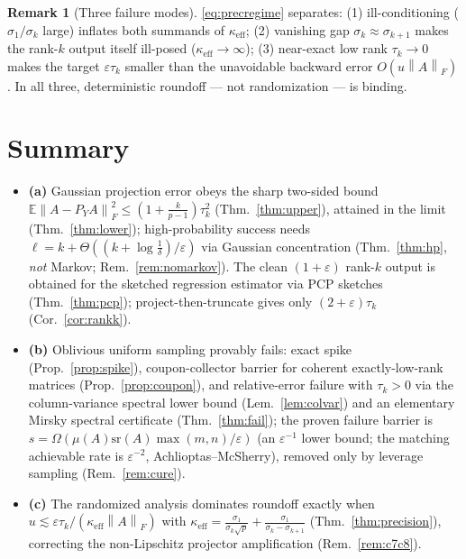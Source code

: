 \documentclass{amsart}
\theoremstyle{definition}
\newtheorem{remark}{Remark}
\newcommand{\Frob}[1]{\left\lVert #1\right\rVert_F}
\newcommand{\E}{\mathbb{E}}
\begin{document}
\begin{remark}[Three failure modes]
\eqref{eq:precregime} separates: (1) ill-conditioning ($\sigma_1/\sigma_k$
large) inflates both summands of $\kappa_{\mathrm{eff}}$; (2) vanishing gap
$\sigma_k\approx\sigma_{k+1}$ makes the rank-$k$ output itself ill-posed
($\kappa_{\mathrm{eff}}\to\infty$); (3) near-exact low rank $\tau_k\to0$ makes
the target $\varepsilon\tau_k$ smaller than the unavoidable backward error
$O(u\Frob A)$. In all three, deterministic roundoff --- not randomization --- is
binding.
\end{remark}

\section{Summary}

\begin{itemize}
\item \textbf{(a)} Gaussian projection error obeys the sharp two-sided bound
$\E\Frob{A-P_YA}^2\le(1+\tfrac k{p-1})\tau_k^2$ (Thm.~\ref{thm:upper}), attained
in the limit (Thm.~\ref{thm:lower}); high-probability success needs
$\ell=k+\Theta((k+\log\tfrac1\delta)/\varepsilon)$ via Gaussian concentration
(Thm.~\ref{thm:hp}, \emph{not} Markov; Rem.~\ref{rem:nomarkov}). The clean
$(1+\varepsilon)$ rank-$k$ output is obtained for the sketched regression
estimator via PCP sketches (Thm.~\ref{thm:pcp}); project-then-truncate gives only
$(2+\varepsilon)\tau_k$ (Cor.~\ref{cor:rankk}).
\item \textbf{(b)} Oblivious uniform sampling provably fails: exact spike
(Prop.~\ref{prop:spike}), coupon-collector barrier for coherent exactly-low-rank
matrices (Prop.~\ref{prop:coupon}), and relative-error failure with $\tau_k>0$
via the column-variance spectral lower bound (Lem.~\ref{lem:colvar}) and an
elementary Mirsky spectral certificate (Thm.~\ref{thm:fail}); the proven failure
barrier is $s=\Omega(\mu(A)\mathrm{sr}(A)\max(m,n)/\varepsilon)$ (an
$\varepsilon^{-1}$ lower bound; the matching achievable rate is
$\varepsilon^{-2}$, Achlioptas--McSherry), removed only by leverage sampling
(Rem.~\ref{rem:cure}).
\item \textbf{(c)} The randomized analysis dominates roundoff exactly when
$u\lesssim\varepsilon\tau_k/(\kappa_{\mathrm{eff}}\Frob A)$ with
$\kappa_{\mathrm{eff}}=\frac{\sigma_1}{\sigma_k\sqrt p}+\frac{\sigma_1}{\sigma_k-\sigma_{k+1}}$
(Thm.~\ref{thm:precision}), correcting the non-Lipschitz projector amplification
(Rem.~\ref{rem:c7c8}).
\end{itemize}
\end{document}
